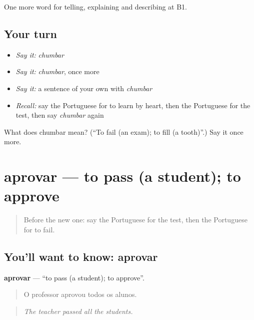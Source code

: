 \begin{grammarlens}[title={What you've built}]
One more word for telling, explaining and describing at B1.
\end{grammarlens}

\subsection*{Your turn}
\begin{itemize}
\raggedright
  \item \emph{Say it:} \emph{chumbar}
  \item \emph{Say it:} \emph{chumbar}, once more
  \item \emph{Say it:} a sentence of your own with \emph{chumbar}
  \item \emph{Recall:} say the Portuguese for to learn by heart, then the Portuguese for the test, then say \emph{chumbar} again
\end{itemize}

\begin{tcolorbox}[breakable,colback=teal!4,colframe=teal!35!black,title={Before you move on}]
What does chumbar mean? (\textquotedblleft{}To fail (an exam); to fill (a tooth)\textquotedblright{}.) Say it once more.
\end{tcolorbox}
\section[aprovar]{aprovar — to pass (a student); to approve}

\label{lesson:PT-C379-aprovar}



\begin{quote}
Before the new one: say the Portuguese for the test, then the Portuguese for to fail.
\end{quote}

\subsection*{You'll want to know: aprovar}
\textbf{aprovar} — \textquotedblleft{}to pass (a student); to approve\textquotedblright{}.

\begin{quote}
O professor aprovou todos os alunos.
\end{quote}

\begin{quote}
\emph{The teacher passed all the students.}
\end{quote}

